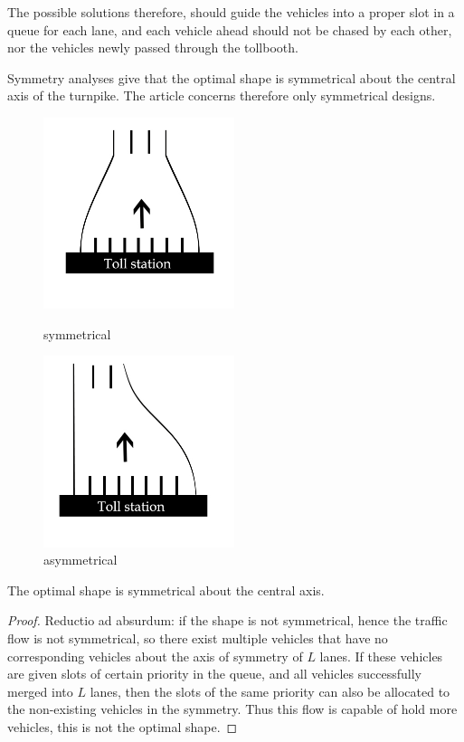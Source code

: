 \documentclass{mcmthesis}
\begin{document}
The possible solutions therefore, should guide the vehicles into a proper slot in a queue for each lane, and each vehicle ahead should not be chased by each other, nor the vehicles newly passed through the tollbooth.

Symmetry analyses give that the optimal shape is symmetrical about the central axis of the turnpike. The article concerns therefore only symmetrical designs.
\begin{figure}
	\begin{minipage}[t]{0.5\linewidth}
		\centering
		\includegraphics[width=2.2in]{symmetrical.jpg}
		\caption{symmetrical}
		\label{symmetrical}
	\end{minipage}%
	\begin{minipage}[t]{0.5\linewidth}
		\centering
		\includegraphics[width=2.2in]{asymmetrical.jpg}
		\caption{asymmetrical}
		\label{asymmetrical}
	\end{minipage}
\end{figure}


\begin{Theorem} \label{thm:yingsongsheng}
The optimal shape is symmetrical about the central axis.
\end{Theorem}

\begin{proof}
Reductio ad absurdum: if the shape is not symmetrical, hence the traffic flow is not symmetrical, so there exist multiple vehicles that have no corresponding vehicles about the axis of symmetry of $L$ lanes. If these vehicles are given slots of certain priority in the queue, and all vehicles successfully merged into $L$ lanes, then the slots of the same priority can also be allocated to the non-existing vehicles in the symmetry. Thus this flow is capable of hold more vehicles, this is not the optimal shape.
\end{proof}
\end{document}
